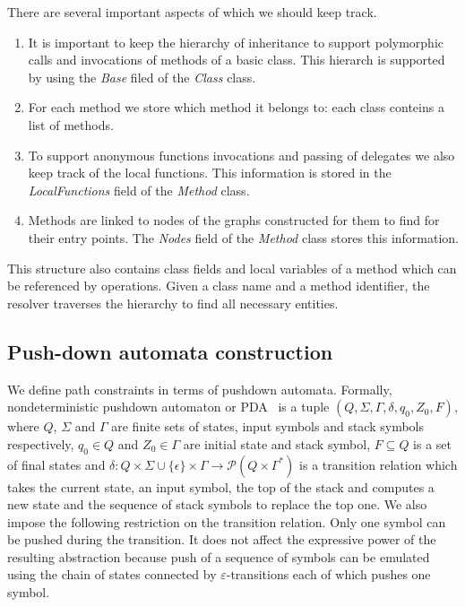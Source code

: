 There are several important aspects of which we should keep track. 
\begin{enumerate}
 \item It is important to keep the hierarchy of inheritance to support polymorphic calls and invocations of methods of a basic class. 
 This hierarch is supported by using the \textit{Base} filed of the \textit{Class} class.
 \item For each method we store which method it belongs to: each class conteins a list of methods.
 \item To support anonymous functions invocations and passing of delegates we also keep track of the local functions. 
 This information is stored in the \textit{LocalFunctions} field of the \textit{Method} class.
 \item Methods are linked to nodes of the graphs constructed for them to find for their entry points. 
 The \textit{Nodes} field of the \textit{Method} class stores this information.
\end{enumerate}
This structure also contains class fields and local variables of a method which can be referenced by operations.
Given a class name and a method identifier, the resolver traverses the hierarchy to find all necessary entities. 

\subsection{Push-down automata construction}

We define path constraints in terms of pushdown automata.
Formally, nondeterministic pushdown automaton or PDA~\cite{AutomataTheory} is a tuple $(Q, \Sigma, \Gamma, \delta, q_0, Z_0, F)$, where $Q$, $\Sigma$ and $\Gamma$ are finite sets of states, input symbols and stack symbols respectively, $q_0 \in Q$ and $Z_0 \in \Gamma$ are initial state and stack symbol, $F \subseteq Q$ is a set of final states and $\delta: Q \times \Sigma \cup \{\epsilon\} \times \Gamma \rightarrow \mathcal P (Q \times \Gamma^*)$ is a transition relation which takes the current state, an input symbol, the top of the stack and computes a new state and the sequence of stack symbols to replace the top one.
We also impose the following restriction on the transition relation.
Only one symbol can be pushed during the transition.
It does not affect the expressive power of the resulting abstraction because push of a sequence of symbols can be emulated using the chain of states connected by $\varepsilon$-transitions each of which pushes one symbol.

